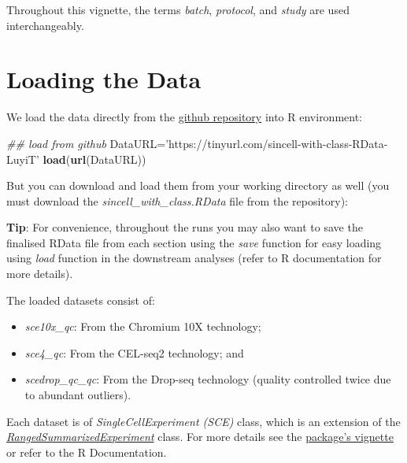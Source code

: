\documentclass[]{book}
\newenvironment{Shaded}{\begin{snugshade}}{\end{snugshade}}
\newcommand{\CommentTok}[1]{\textcolor[rgb]{0.56,0.35,0.01}{\textit{#1}}}
\newcommand{\KeywordTok}[1]{\textcolor[rgb]{0.13,0.29,0.53}{\textbf{#1}}}
\newcommand{\NormalTok}[1]{#1}
\newcommand{\StringTok}[1]{\textcolor[rgb]{0.31,0.60,0.02}{#1}}
\providecommand{\tightlist}{%
  \setlength{\itemsep}{0pt}\setlength{\parskip}{0pt}}
\theoremstyle{definition}
\theoremstyle{definition}
\theoremstyle{definition}
\theoremstyle{remark}
\begin{document}
Throughout this vignette, the terms \emph{batch}, \emph{protocol}, and
\emph{study} are used interchangeably.

\hypertarget{loading-the-data}{%
\section{Loading the Data}\label{loading-the-data}}

We load the data directly from the
\href{https://github.com/LuyiTian/CellBench_data/tree/master/data}{github
repository} into R environment:

\begin{Shaded}
\begin{Highlighting}[]
\CommentTok{## load from github}
\NormalTok{DataURL=}\StringTok{'https://tinyurl.com/sincell-with-class-RData-LuyiT'}
\KeywordTok{load}\NormalTok{(}\KeywordTok{url}\NormalTok{(DataURL))}
\end{Highlighting}
\end{Shaded}

But you can download and load them from your working directory as well
(you must download the \emph{sincell\_with\_class.RData} file from the
repository):

\textbf{Tip}: For convenience, throughout the runs you may also want to
save the finalised RData file from each section using the \emph{save}
function for easy loading using \emph{load} function in the downstream
analyses (refer to R documentation for more details).

The loaded datasets consist of:

\begin{itemize}
\tightlist
\item
  \emph{sce10x\_qc}: From the Chromium 10X technology;
\item
  \emph{sce4\_qc}: From the CEL-seq2 technology; and
\item
  \emph{scedrop\_qc\_qc}: From the Drop-seq technology (quality
  controlled twice due to abundant outliers).
\end{itemize}

Each dataset is of \emph{SingleCellExperiment (SCE)} class, which is an
extension of the
\href{https://www.rdocumentation.org/packages/SummarizedExperiment/versions/1.2.3/topics/RangedSummarizedExperiment-class}{\emph{RangedSummarizedExperiment}}
class. For more details see the
\href{https://bioconductor.org/packages/devel/bioc/vignettes/SingleCellExperiment/inst/doc/intro.html}{package's
vignette} or refer to the R Documentation.
\end{document}

